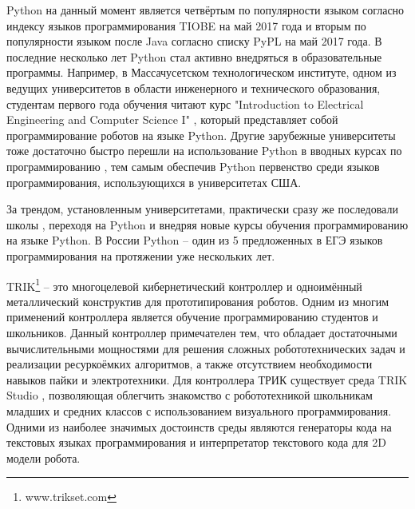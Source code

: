 \documentclass[14pt]{matmex-diploma-custom}
\begin{document}
Python на данный момент является четвёртым по популярности языком согласно индексу языков программирования TIOBE \cite{indextiobe} на май 2017 года и вторым по популярности языком после Java согласно списку PyPL \cite{indexpypl} на май 2017 года. В последние несколько лет Python стал активно внедряться в образовательные программы. Например, в Массачусетском технологическом институте, одном из ведущих \cite{QSUniRating2016, QSUniRating2017} университетов в области инженерного и технического образования, студентам первого года обучения читают курс "Introduction to Electrical Engineering and Computer Science I" \cite{stemMITCourse}, который представляет собой программирование роботов на языке Python. Другие зарубежные университеты тоже достаточно быстро перешли на использование Python в вводных курсах по программированию \cite{pythonUni}, тем самым обеспечив Python первенство среди языков программирования, использующихся в университетах США.

За трендом, установленным университетами, практически сразу же последовали школы \cite{stemSecCourse, stemSchool}, переходя на Python и внедряя новые курсы обучения программированию на языке Python. В России Python -- один из 5 предложенных в ЕГЭ языков программирования на протяжении уже нескольких лет.

TRIK\footnote{www.trikset.com} -- это многоцелевой кибернетический контроллер и одноимённый металлический конструктив для прототипирования роботов. Одним из многим применений контроллера является обучение программированию студентов и школьников. Данный контроллер примечателен тем, что обладает достаточными вычислительными мощностями для решения сложных робототехнических задач и реализации ресуркоёмких алгоритмов, а также отсутствием необходимости навыков пайки и электротехники. Для контроллера ТРИК существует среда TRIK Studio \cite{qrealRobots, TRIKStudioTech}, позволяющая облегчить знакомство с робототехникой школьникам младших и средних классов с использованием визуального программирования. Одними из наиболее значимых достоинств среды являются генераторы кода на текстовых языках программирования и интерпретатор текстового кода для 2D модели робота. 
\end{document}
